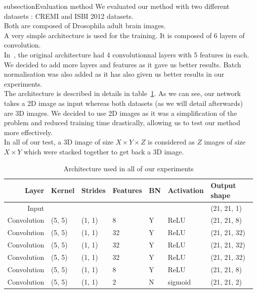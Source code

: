subsection{Evaluation method}
We evaluated our method with two different datasets : CREMI and ISBI 2012 datasets.\\
Both are composed of Drosophila adult brain images.\\

A very simple architecture is used for the training.
It is composed of 6 layers of convolution.\\
In~\cite{turaga_maximin_2009}, the original architecture had 4 convolutionnal
layers with 5 features in each. We decided to add more layers and features as
it gave us better results. 
Batch normalisation was also added as it has also given us better results in
our experiments.\\

The architecture is described in details in table~\ref{tab:archi}. As we can
see, our network takes a 2D image as input whereas both datasets (as we will
detail afterwards) are 3D images. We decided to use 2D images as it was a
simplification of the problem and reduced training time drastically, allowing
us to test our method more effectively.\\
In all of our test, a 3D image of size $X\times Y\times Z$ is considered as $Z$
images of size $X\times Y$ which were stacked together to get back a 3D image.\\

\begin{table}[!htbp]
	\centering
	\begin{tabular}{rllllll}\toprule
		Layer & Kernel & Strides & Features & BN &  Activation & Output shape \\
		\midrule
		Input  &  &  & & & & (21, 21, 1)  \\
		Convolution & (5, 5) & (1, 1) & 8 & Y & ReLU  & (21, 21, 8)  \\
		Convolution & (5, 5) & (1, 1) & 32 & Y & ReLU  & (21, 21, 32)  \\
		Convolution & (5, 5) & (1, 1) & 32 & Y & ReLU  & (21, 21, 32)  \\
		Convolution & (5, 5) & (1, 1) & 32 & Y & ReLU  & (21, 21, 32)  \\
		Convolution & (5, 5) & (1, 1) & 8 & Y & ReLU  & (21, 21, 8)  \\
		Convolution & (5, 5) & (1, 1) & 2 & N & sigmoid  & (21, 21, 2)  \\
		\bottomrule
	\end{tabular}
	\caption{Architecture used in all of our experiments}
	\label{tab:archi}
\end{table}


